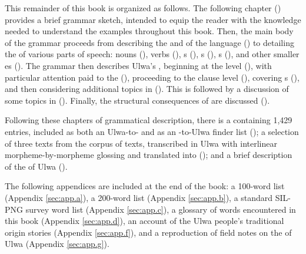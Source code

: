 This remainder of this book is organized as follows. The following chapter () provides a brief grammar sketch, intended to equip the reader with the knowledge needed to understand the examples throughout this book. Then, the main body of the grammar proceeds from describing the  and  of the language () to detailing the  of various  parts of speech: nouns (), verbs (), s (), s (), s (), and other smaller es (). The grammar then describes Ulwa’s , beginning at the  level (), with particular attention paid to the  (), proceeding to the clause level (), covering s (), and then considering additional topics in  (). This is followed by a discussion of some topics in  (). Finally, the structural consequences of  are discussed ().

Following these chapters of grammatical description, there is a  containing 1,429 entries, included as both an Ulwa-to-  and as an -to-Ulwa finder list (); a selection of three texts from the corpus of texts, transcribed in Ulwa with interlinear morpheme-by-morpheme glossing and translated into  (); and a brief description of the   of Ulwa ().

The following appendices are included at the end of the book: a   100-word list (Appendix \ref{sec:app.a}), a  200-word list (Appendix \ref{sec:app.b}), a standard SIL-PNG survey word list (Appendix \ref{sec:app.c}), a glossary of  words encountered in this book (Appendix \ref{sec:app.d}), an account of the Ulwa people’s traditional origin stories (Appendix \ref{sec:app.f}), and a reproduction of  field notes on the   of Ulwa (Appendix \ref{sec:app.g}).
